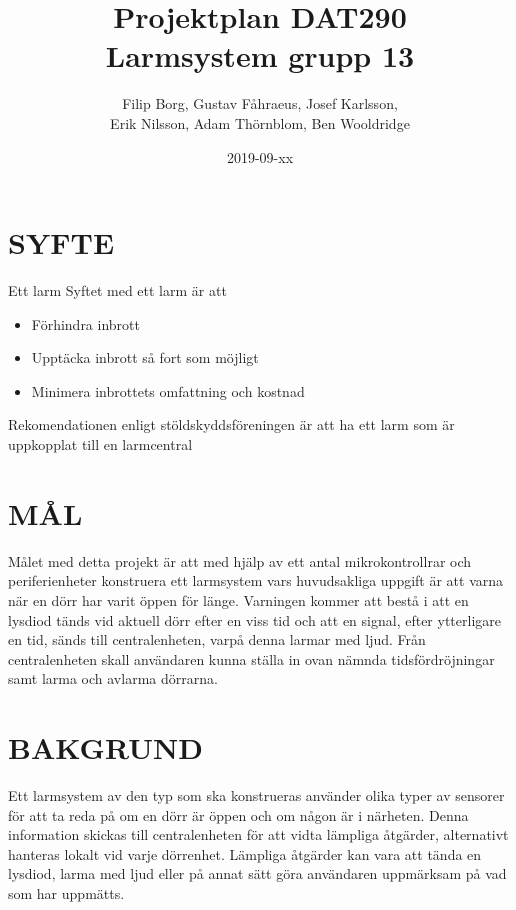 \documentclass[a4paper]{article}
\title{Projektplan DAT290 \\ \Large Larmsystem grupp 13}
\author{Filip Borg, Gustav Fåhraeus, Josef Karlsson,\\
            Erik Nilsson, Adam Thörnblom, Ben Wooldridge}
\date{2019-09-xx}
\begin{document}
\maketitle
{}
\newpage

\tableofcontents
\newpage



\section{SYFTE}
\label{sec:syfte}
Ett larm
Syftet med ett larm är att
\begin{itemize}
    \item Förhindra inbrott
    \item Upptäcka inbrott så fort som möjligt
    \item Minimera inbrottets omfattning och kostnad
    
\end{itemize}
Rekomendationen enligt stöldskyddsföreningen är att ha ett larm
som är uppkopplat till en larmcentral

\section{MÅL}
\label{sec:mål}

Målet med detta projekt är att med hjälp av ett antal mikrokontrollrar och periferienheter konstruera ett larmsystem vars huvudsakliga uppgift är att varna när en dörr har varit öppen för länge. Varningen kommer att bestå i att en lysdiod tänds vid aktuell dörr efter en viss tid och att en signal, efter ytterligare en tid, sänds till centralenheten, varpå denna larmar med ljud. Från centralenheten skall användaren kunna ställa in ovan nämnda tidsfördröjningar samt larma och avlarma dörrarna.

\section{BAKGRUND}
\label{sec:bakgrund}

Ett larmsystem av den typ som ska konstrueras använder olika typer av sensorer för att ta reda på om en dörr är öppen och om någon är i närheten. Denna information skickas till centralenheten för att vidta lämpliga åtgärder, alternativt hanteras lokalt vid varje dörrenhet.
Lämpliga åtgärder kan vara att tända en lysdiod, larma med ljud eller på annat sätt göra användaren uppmärksam på vad som har uppmätts.
\end{document}

